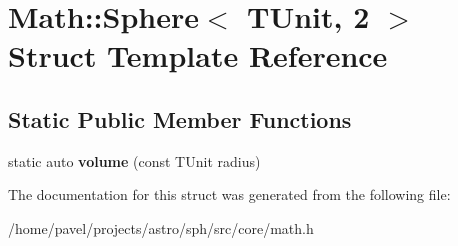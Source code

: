 \hypertarget{structMath_1_1Sphere_3_01TUnit_00_012_01_4}{}\section{Math\+:\+:Sphere$<$ T\+Unit, 2 $>$ Struct Template Reference}
\label{structMath_1_1Sphere_3_01TUnit_00_012_01_4}
\subsection*{Static Public Member Functions}
\begin{DoxyCompactItemize}
\item 
\hypertarget{structMath_1_1Sphere_3_01TUnit_00_012_01_4_ad2a3be5f6b62737f3ee4aa7e829151e5}{}\label{structMath_1_1Sphere_3_01TUnit_00_012_01_4_ad2a3be5f6b62737f3ee4aa7e829151e5} 
static auto {\bfseries volume} (const T\+Unit radius)
\end{DoxyCompactItemize}


The documentation for this struct was generated from the following file\+:\begin{DoxyCompactItemize}
\item 
/home/pavel/projects/astro/sph/src/core/math.\+h\end{DoxyCompactItemize}
